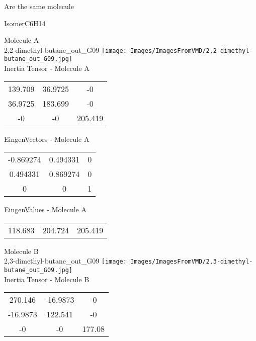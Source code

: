 \begin{center}
\vtab
\vtab
\textcolor{NavyBlue}{\Large Are the same molecule}
\end{center}
\newpage

\vtab[-2cm]
\begin{center}
{\large IsomerC6H14}
\end{center}
\begin{multicols}{2}
\begin{center}
Molecule A \\ 
2,2-dimethyl-butane\_out\_G09
\texttt{[image: Images/ImagesFromVMD/2,2-dimethyl-butane\_out\_G09.jpg]}
\\
Inertia Tensor - Molecule A \\
\vtab
\begin{tabular}{|c c c|}
139.709	 & 	36.9725	 & 	-0	 \\
36.9725	 & 	183.699	 & 	-0	 \\
-0	 & 	-0	 & 	205.419
\end{tabular}

\vtab
 EingenVectors - Molecule A     \\
\vtab
\begin{tabular}{|c c c|}
-0.869274	 & 	0.494331	 & 	0	 \\
0.494331	 & 	0.869274	 & 	0	 \\
0	 & 	0	 & 	1
\end{tabular}

\vtab
 EingenValues - Molecule A     \\
\vtab
\begin{tabular}{|c c c|}
118.683	 & 	204.724	 & 	205.419
\end{tabular}
\columnbreak

Molecule B \\ 
2,3-dimethyl-butane\_out\_G09
\texttt{[image: Images/ImagesFromVMD/2,3-dimethyl-butane\_out\_G09.jpg]}
\\
Inertia Tensor - Molecule B \\
\vtab
\begin{tabular}{|c c c|}
270.146	 & 	-16.9873	 & 	-0	 \\
-16.9873	 & 	122.541	 & 	-0	 \\
-0	 & 	-0	 & 	177.08
\end{tabular}


\end{center}
\end{multicols}
